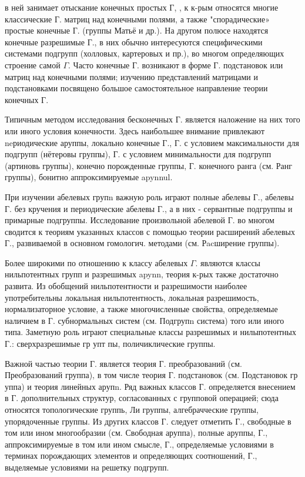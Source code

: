 \documentclass[10pt]{article}
\begin{document}
в ней занимает отыскание конечных простых Г, , к к-рым относятся многие классические Г. матриц над конечными полями, а также "спорадические» простые конечные Г. (группы Матьё и др.). На другом полюсе находятся конечные разрешимые Г., в них обычно интересуются специфическими системами подгрупп (холловых, картеровых и пр.), во многом определяющих строение самой $\Gamma$. Часто конечные Г. возникают в форме Г. подстановок или матриц над конечными полями; изучению представлений матрицами и подстановками посвящено большое самостоятельное направление теории конечных Г.



Типичным методом исследования бесконечных Г. является наложение на них того или иного условия конечности. Здесь наибольшее внимание привлекают neриодические аруппы, локально конечные Г., Г. с условием максимальности для подгрупп (нётеровы группы), Г. с условием минимальности для подгрупп (артиновь группы), конечно порожденные группы, Г. конечного ранга (см. Ранг группы), бонитно аппроксимируемые apynnul.



При изучении абелевых групn важную роль играют полные абелевы Г., абелевы Г. без кручения и периодические абелевы Г., а в них - сервантные подгруппы и примарные подгруппы. Исследование произвольной абелевой Г. во многом сводится к теориям указанных классов с помощью теории расширений абелевых Г., развиваемой в основном гомологич. методами (см. Рacширение группы).



Более широкими по отношению к классу абелевых $\Gamma$. являются классы нильпотентных групп и разрешимых apynn, теория к-рых также достаточно развита. Из обобщений нильпотентности и разрешимости наиболее употребительны локальная нильпотентность, локальная разрешимость, нормализаторное условие, а также многочисленные свойства, определяемые наличием в Г. субнормальных систем (см. Подгрупn система) того или иного типа. Заметную роль играют специальные классы разрешимых и нилыпотентных Г.: сверхразрешимые гр упт пы, поличиклические группы.



Важной частью теории Г. является теория Г. преобразований (см. Преобразований группа), в том числе теория Г. подстановок (см. Подстановок гр уппа) и теория линейных арупn. Ряд важных классов Г. определяется внесением в Г. дополнительных структур, согласованных с групповой операцией; сюда относятся топологические группь, Ли группы, алгебрачческие группы, упорядоченные группы. Из других классов Г. следует отметить Г., свободные в том или ином многообразии (см. Свободная аруппа), полные аруппы, Г., аппроксимируемые в том или ином смысле, Г., определяемые условиями в терминах порождающих элементов и определяющих соотношений, Г., выделяемые условиями на решетку подгрупп.
\end{document}
